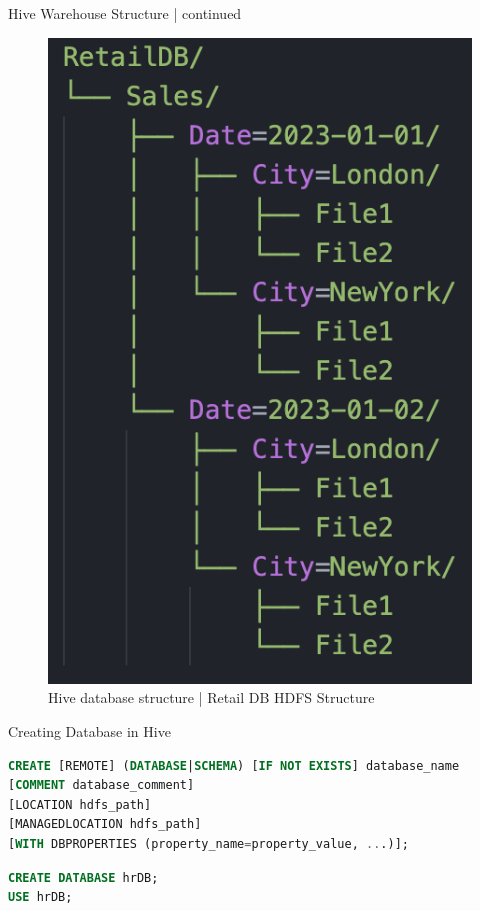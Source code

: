 \begin{frame}[fragile]{Hive Warehouse Structure | continued}

	\begin{figure}
	\includegraphics[width=\textwidth,height=.65\textheight,keepaspectratio]{./Figures/chapter-03/Screenshot_retail_db.png}
		
	\caption{Hive database structure | Retail DB HDFS Structure}	
	\end{figure}
	\end{frame}

\begin{frame}[fragile]{Creating Database in Hive}

\begin{lstlisting}[caption={Create Database command in Hive},language=SQL]
CREATE [REMOTE] (DATABASE|SCHEMA) [IF NOT EXISTS] database_name
[COMMENT database_comment]
[LOCATION hdfs_path]
[MANAGEDLOCATION hdfs_path]
[WITH DBPROPERTIES (property_name=property_value, ...)];  
\end{lstlisting}	
\begin{lstlisting}[caption={Create Database Example},language=SQL]
CREATE DATABASE hrDB;
USE hrDB;
\end{lstlisting}		

\end{frame}  

